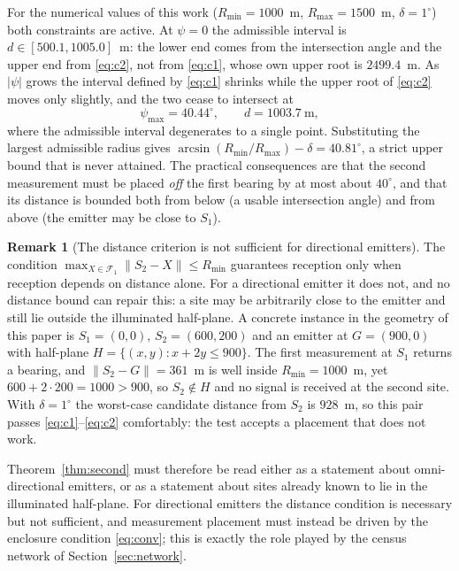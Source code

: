 \documentclass[preprint,12pt,3p]{elsarticle}
\theoremstyle{definition}
\newtheorem{remark}[theorem]{Remark}
\newcommand{\Rmin}{R_{\min}}
\newcommand{\Rmax}{R_{\max}}
\newcommand{\bF}{\mathcal{F}}
\begin{document}
For the numerical values of this work ($\Rmin=1000$~m, $\Rmax=1500$~m, $\delta=1^\circ$)
both constraints are active. At $\psi=0$ the admissible interval is
$d\in[500.1,1005.0]$~m: the lower end comes from the intersection angle and the upper end from
\eqref{eq:c2}, not from \eqref{eq:c1}, whose own upper root is $2499.4$~m. As $|\psi|$ grows the
interval defined by \eqref{eq:c1} shrinks while the upper root of \eqref{eq:c2} moves only
slightly, and the two cease to intersect at
\begin{equation}
\psi_{\max}=40.44^\circ,\qquad d=1003.7\ \text{m},
\label{eq:psimax}
\end{equation}
where the admissible interval degenerates to a single point. Substituting the largest admissible
radius gives $\arcsin(\Rmin/\Rmax)-\delta=40.81^\circ$, a strict upper bound that is never
attained. The practical consequences are that the second measurement must be placed \emph{off} the
first bearing by at most about $40^\circ$, and that its distance is bounded both from below (a
usable intersection angle) and from above (the emitter may be close to $S_1$).


\begin{remark}[The distance criterion is not sufficient for directional emitters]
\label{rem:dirsecond}
The condition $\max_{X\in\bF_1}\|S_2-X\|\le\Rmin$ guarantees reception only when reception depends
on distance alone. For a directional emitter it does not, and no distance bound can repair this: a
site may be arbitrarily close to the emitter and still lie outside the illuminated half-plane.
A concrete instance in the geometry of this paper is $S_1=(0,0)$, $S_2=(600,200)$ and an emitter at
$G=(900,0)$ with half-plane $H=\{(x,y):x+2y\le900\}$. The first measurement at $S_1$ returns a
bearing, and $\|S_2-G\|=361$~m is well inside $\Rmin=1000$~m, yet
$600+2\cdot200=1000>900$, so $S_2\notin H$ and no signal is received at the second site. With
$\delta=1^\circ$ the worst-case candidate distance from $S_2$ is $928$~m, so this pair passes
\eqref{eq:c1}--\eqref{eq:c2} comfortably: the test accepts a placement that does not work.

Theorem~\ref{thm:second} must therefore be read either as a statement about omni-directional
emitters, or as a statement about sites already known to lie in the illuminated half-plane. For
directional emitters the distance condition is necessary but not sufficient, and measurement
placement must instead be driven by the enclosure condition \eqref{eq:conv}; this is exactly the
role played by the census network of Section~\ref{sec:network}.
\end{remark}
\end{document}
